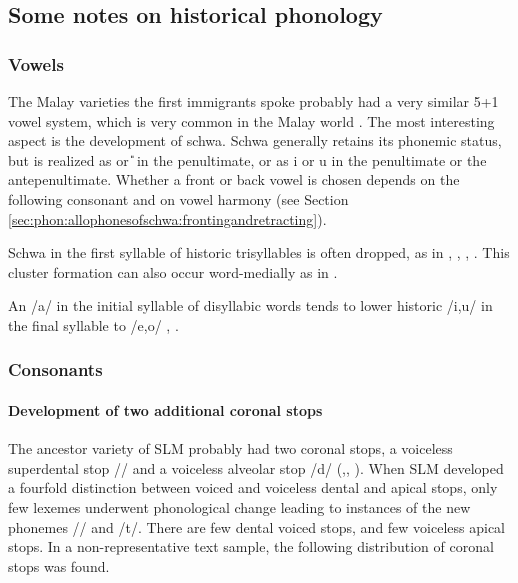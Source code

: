 \subsection{Some notes on historical phonology}\label{sec:phon:Somenotesonhistoricalphonology}
\subsubsection{Vowels}\label{sec:phon:hist:Vowels} 
The Malay varieties the first immigrants spoke probably had a very similar 5+1 vowel system, which is very common in the Malay world \citep{Adelaar1985}. The most interesting aspect is the development of schwa. Schwa generally retains its phonemic status, but is realized as \I{} or \U{} in the penultimate, or as i or u in the penultimate or the antepenultimate. Whether a front or back vowel is chosen depends on the following consonant and on vowel harmony (see Section \ref{sec:phon:allophonesofschwa:frontingandretracting}).

Schwa in the first syllable of historic trisyllables is often dropped, as in  ,  , ,  . This cluster formation can also occur word-medially as in .

An /a/ in the initial syllable of disyllabic words tends to lower historic /i,u/ in the final syllable to /e,o/ , \citep[75]{Bichsel}.

\subsubsection{Consonants}\label{sec:phon:hist:Consonants}
\paragraph{Development of two additional coronal stops}
The ancestor variety of SLM probably had two coronal stops, a voiceless superdental stop /\dentt{}/ and a voiceless alveolar stop /d/ (\citet[10]{Adelaar1985},\citet[26]{Adelaar1991}, \citet{SmithEtAl2004}). When SLM developed a fourfold distinction between voiced and voiceless dental and apical stops, only few lexemes underwent phonological change leading to instances of the new phonemes /\dentd/ and /t/. There are few dental voiced stops, and few voiceless apical stops. In a non-representative text sample, the following distribution of coronal stops was found.


